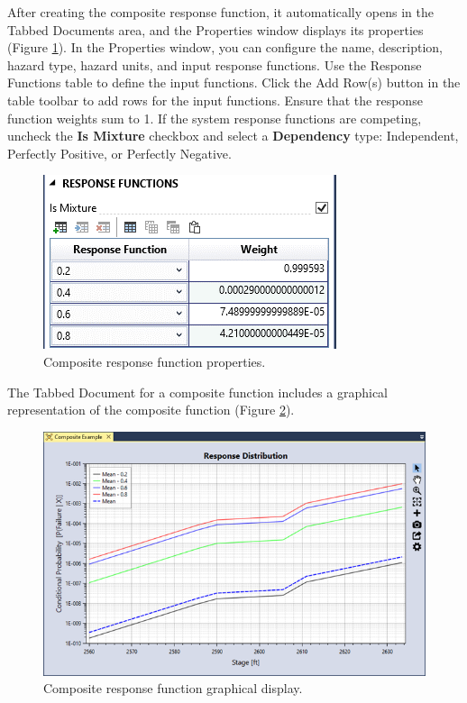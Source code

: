\documentclass[
]{book}
\begin{document}
After creating the composite response function, it automatically opens in the Tabbed Documents area, and the Properties window displays its properties (Figure \ref{fig:figure-110}). In the Properties window, you can configure the name, description, hazard type, hazard units, and input response functions. Use the Response Functions table to define the input functions. Click the Add Row(s) button in the table toolbar to add rows for the input functions. Ensure that the response function weights sum to 1. If the system response functions are competing, uncheck the \textbf{Is Mixture} checkbox and select a \textbf{Dependency} type: Independent, Perfectly Positive, or Perfectly Negative.

\begin{figure}

{\centering \includegraphics{images/figure110} 

}

\caption{Composite response function properties.}\label{fig:figure-110}
\end{figure}

The Tabbed Document for a composite function includes a graphical representation of the composite function (Figure \ref{fig:figure-111}).

\begin{figure}

{\centering \includegraphics{images/figure111} 

}

\caption{Composite response function graphical display.}\label{fig:figure-111}
\end{figure}
\end{document}
